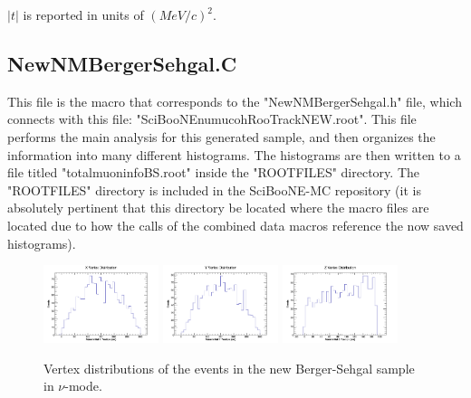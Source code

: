 \documentclass[11pt]{article}
\begin{document}
\noindent
$|t|$ is reported in units of $(MeV/c)^2$.

\subsection{NewNMBergerSehgal.C}
This file is the macro that corresponds to the "NewNMBergerSehgal.h" file, which connects with this file: "SciBooNE\textunderscore numu\textunderscore coh\textunderscore RooTrack\textunderscore NEW.root". This file performs the main analysis for this generated sample, and then organizes the information into many different histograms. The histograms are then written to a file titled "totalmuoninfoBS.root" inside the "ROOTFILES" directory. The "ROOTFILES" directory is included in the SciBooNE-MC repository (it is absolutely pertinent that this directory be located where the macro files are located due to how the calls of the combined data macros reference the now saved histograms).

\begin{figure}[H]
\centering
\includegraphics[width=0.3\textwidth]{NewNMBergerSehgalImages/4-XVertexDistributionNMBS.png}
\includegraphics[width=0.3\textwidth]{NewNMBergerSehgalImages/3-YVertexDistributionNMBS.png}
\includegraphics[width=0.3\textwidth]{NewNMBergerSehgalImages/2-ZVertexDistributionNMBS.png}
\caption{Vertex distributions of the events in the new Berger-Sehgal sample in $\nu$-mode.}
\end{figure}
\end{document}
